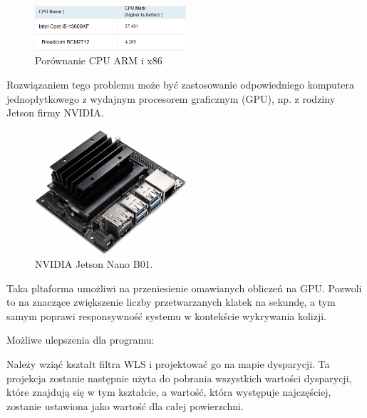 \documentclass[magisterska]{pracadypl}
\begin{document}
\begin{figure}[H]  %
    \centering  %
    \includegraphics[width=0.5\textwidth]{images/cpu-compare.png}  %
    \captionsetup{font=footnotesize}
    \caption[Porównanie CPU ARM i x86. https://www.cpubenchmark.net/]{Porównanie CPU ARM i x86}
\end{figure}

Rozwiązaniem tego problemu może być zastosowanie odpowiedniego komputera jednopłytkowego z wydajnym procesorem graficznym (GPU), np. z rodziny Jetson firmy NVIDIA.

\begin{figure}[H]  %
    \centering  %
    \includegraphics[width=0.5\textwidth]{images/jetson.png}  %
    \captionsetup{font=footnotesize}
    \caption[NVIDIA Jetson Nano B01. https://kamami.pl/wycofane-z-oferty/574587-zestaw-deweloperski-nvidia-jetson-nano.html]{NVIDIA Jetson Nano B01.}
\end{figure}

Taka pltaforma umożliwi na przeniesienie omawianych obliczeń na GPU. Pozwoli to na znaczące zwiększenie liczby przetwarzanych klatek na sekundę, a tym samym poprawi responsywność systemu w kontekście wykrywania kolizji.

Możliwe ulepszenia dla programu:

Należy wziąć kształt filtra WLS i projektować go na mapie dysparycji. Ta projekcja zostanie następnie użyta do pobrania wszystkich wartości dysparycji, które znajdują się w tym kształcie, a wartość, która występuje najczęściej, zostanie ustawiona jako wartość dla całej powierzchni.
\end{document}
